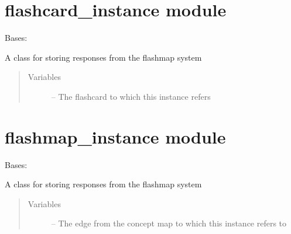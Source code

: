 \documentclass[letterpaper,10pt,english]{sphinxmanual}
\begin{document}
\section{flashcard\_instance module}
\label{\detokenize{flashcard_instance:flashcard-instance-module}}\label{\detokenize{flashcard_instance:module-flashcard_instance}}\label{\detokenize{flashcard_instance::doc}}

\begin{fulllineitems}
\label{\detokenize{flashcard_instance:flashcard_instance.FlashcardInstance}}
Bases: {\hyperref[\detokenize{instance:instance.Instance}]{}}

A class for storing responses from the flashmap system
\begin{quote}\begin{description}
\item[{Variables}] \leavevmode
{} -- The flashcard to which this instance refers

\end{description}\end{quote}

\end{fulllineitems}



\section{flashmap\_instance module}
\label{\detokenize{flashmap_instance:module-flashmap_instance}}\label{\detokenize{flashmap_instance:flashmap-instance-module}}\label{\detokenize{flashmap_instance::doc}}

\begin{fulllineitems}
\label{\detokenize{flashmap_instance:flashmap_instance.FlashmapInstance}}
Bases: {\hyperref[\detokenize{instance:instance.Instance}]{}}

A class for storing responses from the flashmap system
\begin{quote}\begin{description}
\item[{Variables}] \leavevmode
{} -- The edge from the concept map to which this instance refers to

\end{description}\end{quote}

\end{fulllineitems}
\end{document}

